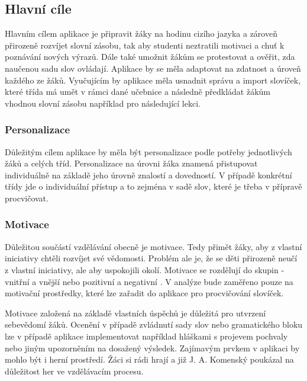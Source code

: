 \documentclass[a4paper,11pt,titlepage,fleqn]{article}
\begin{document}
    \subsection{Hlavní cíle}
        
        Hlavním cílem aplikace je připravit žáky na hodinu cizího jazyka a zároveň přirozeně rozvíjet slovní zásobu, tak aby studenti neztratili motivaci a chuť k poznávání nových výrazů. Dále také umožnit žákům se protestovat a ověřit, zda naučenou sadu slov ovládají. Aplikace by se měla adaptovat na zdatnost a úroveň každého ze žáků. Vyučujícím by aplikace měla usnadnit správu a import slovíček, které třída má umět v rámci dané učebnice a následně předkládat žákům vhodnou slovní zásobu například pro následující lekci.

        \subsubsection{Personalizace}
            Důležitým cílem aplikace by měla být personalizace podle potřeby jednotlivých žáků a celých tříd. Personalizace na úrovni žáka znamená přistupovat individuálně na základě jeho úrovně znalostí a dovedností. V případě konkrétní třídy jde o individuální přístup a to zejména v sadě slov, které je třeba v přípravě procvičovat. 

        \subsubsection{Motivace}
            Důležitou součástí vzdělávání obecně je motivace. Tedy přimět žáky, aby z vlastní iniciativy chtěli rozvíjet své vědomosti. Problém ale je, že se děti přirozeně neučí z vlastní iniciativy, ale aby uspokojili okolí. Motivace se rozdělují do skupin - vnitřní a vnější nebo pozitivní a negativní \cite{bib:motivace}. V analýze bude zaměřeno pouze na motivační prostředky, které lze zařadit do aplikace pro procvičování slovíček.

            Motivace založená na základě vlastních úspěchů je důležitá pro utvrzení sebevědomí žáků. Ocenění v případě zvládnutí sady slov nebo gramatického bloku lze v případě aplikace implementovat například hláškami s projevem pochvaly nebo jiným upozorněním na dosažený výsledek. Zajímavým prvkem v aplikaci by mohlo být i herní prostředí. Žáci si rádi hrají a již J. A. Komenský poukázal na důležitost her ve vzdělávacím procesu.
\end{document}
